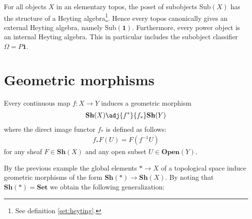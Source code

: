 	
	\begin{property}
		For all objects $X$ in an elementary topos, the poset of subobjects Sub$(X)$ has the structure of a Heyting algebra\footnote{See definition \ref{set:heyting}.}. Hence every topos canonically gives an external Heyting algebra, namely Sub$(\mathbf{1})$. Furthermore, every power object is an internal Heyting algebra. This in particular includes the subobject classifier $\Omega=P{\mathbf{1}}$.
	\end{property}

\section{Geometric morphisms}


	
	\begin{example}
		Every continuous map $f:X\rightarrow Y$ induces a geometric morphism
		\begin{gather}
			\textbf{Sh}(X)\adj{f^*}{f_*}\textbf{Sh}(Y)
		\end{gather}
		where the direct image functor $f_*$ is defined as follows:
		\begin{gather}
			f_*F(U) = F(f^{-1}U)
		\end{gather}
		for any sheaf $F\in\textbf{Sh}(X)$ and any open subset $U\in\textbf{Open}(Y)$.
	\end{example}
	
	By the previous example the global elements $\ast\rightarrow X$ of a topological space induce geometric morphisms of the form $\textbf{Sh}(\ast)\rightarrow\textbf{Sh}(X)$. By noting that $\textbf{Sh}(\ast)=\textbf{Set}$ we obtain the following generalization:
	
